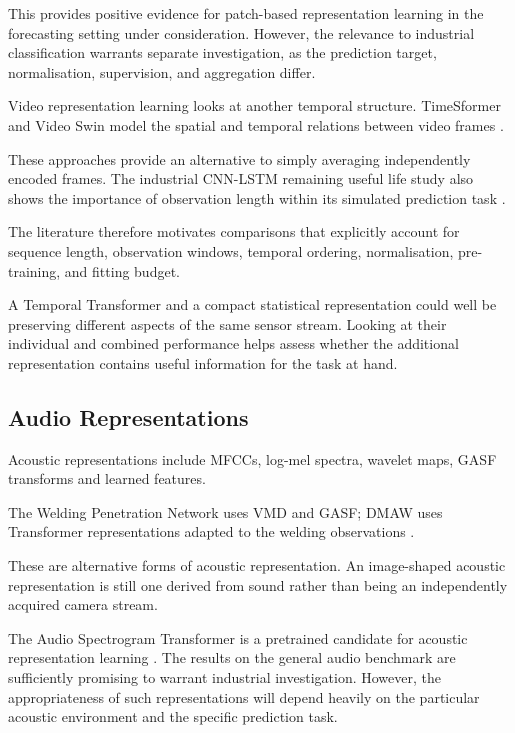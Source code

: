 This provides positive evidence for patch-based representation learning in the forecasting setting
under consideration. However, the relevance to industrial classification warrants separate
investigation, as the prediction target, normalisation, supervision, and aggregation differ.

Video representation learning looks at another temporal structure. TimeSformer and Video Swin model
the spatial and temporal relations between video frames \parencite{P034,P013}.

These approaches provide an alternative to simply averaging independently encoded frames. The
industrial CNN-LSTM remaining useful life study also shows the importance of observation length
within its simulated prediction task \parencite{AlDulaimi2019A}.

The literature therefore motivates comparisons that explicitly account for sequence length,
observation windows, temporal ordering, normalisation, pre-training, and fitting budget.

A Temporal Transformer and a compact statistical representation could well be preserving different
aspects of the same sensor stream. Looking at their individual and combined performance helps assess
whether the additional representation contains useful information for the task at hand.

\subsection{Audio Representations}

Acoustic representations include MFCCs, log-mel spectra, wavelet maps, GASF transforms and learned
features.

The Welding Penetration Network uses VMD and GASF; DMAW uses Transformer representations adapted to
the welding observations \parencite{Hua2026Weld,P003}.

These are alternative forms of acoustic representation. An image-shaped acoustic representation is
still one derived from sound rather than being an independently acquired camera stream.

The Audio Spectrogram Transformer is a pretrained candidate for acoustic representation learning
\parencite{P011}. The results on the general audio benchmark are sufficiently promising to warrant
industrial investigation. However, the appropriateness of such representations will depend heavily
on the particular acoustic environment and the specific prediction task.

